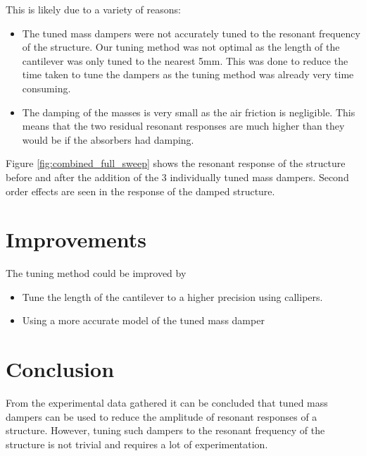 \documentclass[8pt]{article}
\begin{document}
This is likely due to a variety of reasons:
\begin{itemize}
    \item The tuned mass dampers were not accurately tuned to the resonant frequency of the structure. Our tuning method was not optimal as the length of the cantilever was only tuned to the nearest 5mm.
            This was done to reduce the time taken to tune the dampers as the tuning method was already very time consuming.
    \item The damping of the masses is very small as the air friction is negligible. This means that the two residual resonant responses are much higher than they would be if the absorbers had damping.
\end{itemize}

Figure \ref{fig:combined_full_sweep} shows the resonant response of the structure before and after the addition of the 3 individually tuned mass dampers.
Second order effects are seen in the response of the damped structure.

\section{Improvements}

The tuning method could be improved by 
\begin{itemize}
    \item Tune the length of the cantilever to a higher precision using callipers.
    \item Using a more accurate model of the tuned mass damper
\end{itemize}

\section{Conclusion}

From the experimental data gathered it can be concluded that tuned mass dampers can be used to reduce the amplitude of resonant responses of a structure.
However, tuning such dampers to the resonant frequency of the structure is not trivial and requires a lot of experimentation.
\end{document}
